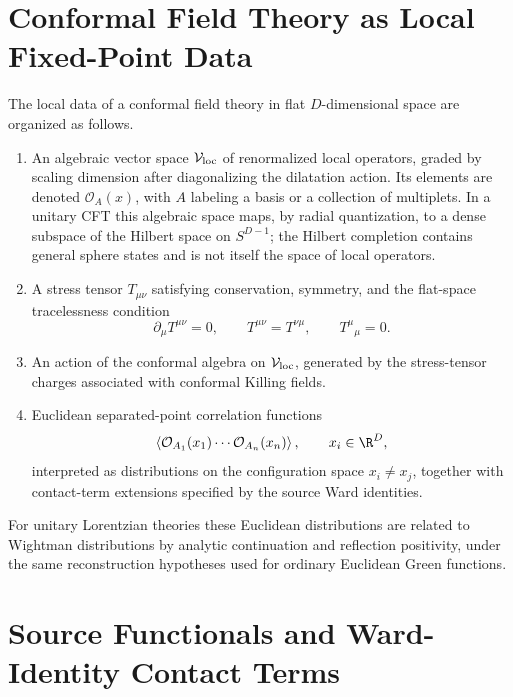\section{Conformal Field Theory as Local Fixed-Point Data}

The local data of a conformal field theory in flat \(D\)-dimensional space are
organized as follows.
\begin{enumerate}
  \item An algebraic vector space \(\mathcal V_{\rm loc}\) of renormalized
  local operators, graded by scaling dimension after diagonalizing the
  dilatation action.  Its elements are denoted
  \(\mathcal O_A(x)\), with \(A\) labeling a basis or a collection of
  multiplets.  In a unitary CFT this algebraic space maps, by radial
  quantization, to a dense subspace of the Hilbert space on \(S^{D-1}\); the
  Hilbert completion contains general sphere states and is not itself the
  space of local operators.
  \item A stress tensor \(T_{\mu\nu}\) satisfying conservation, symmetry, and
  the flat-space tracelessness condition
  \[
    \partial_\mu T^{\mu\nu}=0,
    \qquad
    T^{\mu\nu}=T^{\nu\mu},
    \qquad
    T^\mu{}_\mu=0 .
  \]
  \item An action of the conformal algebra on \(\mathcal V_{\rm loc}\),
  generated by the stress-tensor charges associated with conformal Killing
  fields.
  \item Euclidean separated-point correlation functions
  \[
    \left\langle
    \mathcal O_{A_1}(x_1)\cdots\mathcal O_{A_n}(x_n)
    \right\rangle,
    \qquad
    x_i\in\R^D,
  \]
  interpreted as distributions on the configuration space
  \(x_i\neq x_j\), together with contact-term extensions specified by the
  source Ward identities.
\end{enumerate}
For unitary Lorentzian theories these Euclidean distributions are related to
Wightman distributions by analytic continuation and reflection positivity,
under the same reconstruction hypotheses used for ordinary Euclidean Green
functions.

\section{Source Functionals and Ward-Identity Contact Terms}
\label{sec:cft-source-functionals-ward-contacts}

